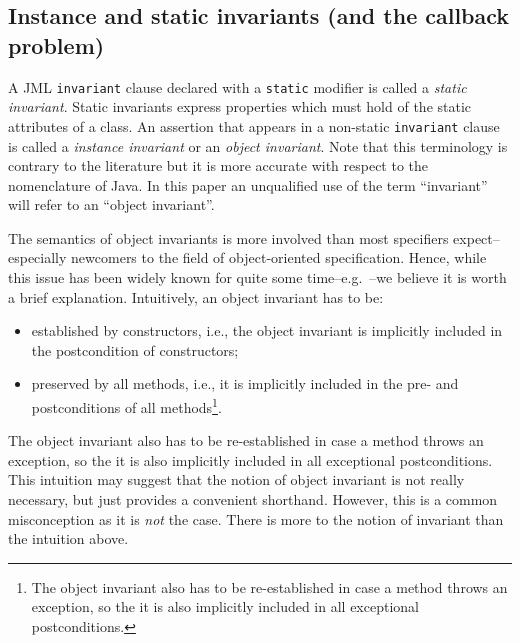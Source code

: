 \documentclass{llncs}
\begin{document}
\subsection{Instance and static invariants (and the callback problem)}

A JML \texttt{invariant} clause declared with a
\texttt{static} modifier is called a \emph{static invariant}.
%
Static invariants express properties which must hold of the static
attributes of a class.
%
An assertion that appears in a non-static \texttt{invariant} clause is called
a \emph{instance invariant} or an \emph{object invariant}.
%
Note that this terminology is contrary to the literature but it is more
accurate with respect to the nomenclature of Java.  In this paper an
unqualified use of the term ``invariant'' will refer to an ``object
invariant''.

%
%
%

The semantics of object invariants is more involved than most specifiers
expect--especially newcomers to the field of object-oriented specification.
Hence, while this issue has been widely known for quite some time--e.g.\
\cite{Szyperski98}--we believe it is worth a brief explanation.
%
Intuitively, an object invariant has to be:
\begin{itemize}
  \item established by constructors, i.e., the object invariant is implicitly
    included in the postcondition of constructors;
  \item preserved by all methods, i.e., it is implicitly included in the pre-
    and postconditions of all methods\footnote{The object invariant also has 
    to be re-established in case a method throws an exception, so the it is also 
    implicitly included in all exceptional postconditions.}.
\end{itemize}
The object invariant also has to be re-established in case a method throws an exception,
so the it is also implicitly included in all exceptional postconditions.
%
This intuition may suggest that the notion of object invariant is not really
necessary, but just provides a convenient shorthand.  However, this is a
common misconception as it is \emph{not} the case. There is more to the notion
of invariant than the intuition above.
\end{document}
